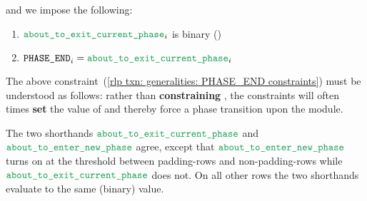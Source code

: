 and we impose the following:
\begin{enumerate}
    \item
        $\locAboutToExitPhase _{i}$ is binary \quad (\sanityCheck)
    \item \label{rlp txn: generalities: PHASE_END constraints}
        $\phaseEnd_{i} = \locAboutToExitPhase _{i}$
\end{enumerate}
\saNote{}
The above constraint~(\ref{rlp txn: generalities: PHASE_END constraints})
must be understood as follows: rather than \textbf{constraining} \phaseEnd{},
the constraints will often times \textbf{set} the value of \phaseEnd{} and thereby force a phase transition upon the module.

\saNote{}
The two shorthands $\locAboutToExitPhase$ and $\locAboutToEnterNewPhase$
agree, except that $\locAboutToEnterNewPhase$ turns on at the threshold between
padding-rows and non-padding-rows while $\locAboutToExitPhase$ does not.
On all other rows the two shorthands evaluate to the same (binary) value.
